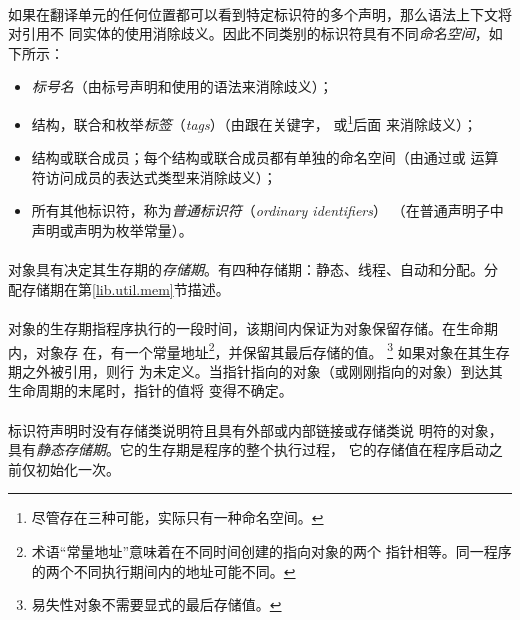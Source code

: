 {\paragraph{}
如果在翻译单元的任何位置都可以看到特定标识符的多个声明，那么语法上下文将对引用不
同实体的使用消除歧义。因此不同类别的标识符具有不同\textit{命名空间}，如下所示：
\begin{itemize}
  \item{\textit{标号名}（由标号声明和使用的语法来消除歧义）；}
  \item{结构，联合和枚举\textit{标签}（\textit{tags}）（由跟在关键字，
    或\footnote{尽管存在三种可能，实际只有一种命名空间。}后面
    来消除歧义）；}
  \item{结构或联合成员；每个结构或联合成员都有单独的命名空间（由通过或
    \tm{->}运算符访问成员的表达式类型来消除歧义）；}
  \item{所有其他标识符，称为\textit{普通标识符}（\textit{ordinary identifiers}）
    （在普通声明子中声明或声明为枚举常量）。}
\end{itemize}


\paragraph{}
对象具有决定其生存期的\textit{存储期}。有四种存储期：静态、线程、自动和分配。分
配存储期在第\ref{lib.util.mem}节描述。

\paragraph{}
对象的生存期指程序执行的一段时间，该期间内保证为对象保留存储。在生命期内，对象存
在，有一个常量地址\footnote{术语``常量地址''意味着在不同时间创建的指向对象的两个
指针相等。同一程序的两个不同执行期间内的地址可能不同。}，并保留其最后存储的值。
\footnote{易失性对象不需要显式的最后存储值。} 如果对象在其生存期之外被引用，则行
为未定义。当指针指向的对象（或刚刚指向的对象）到达其生命周期的末尾时，指针的值将
变得不确定。

\paragraph{}
标识符声明时没有存储类说明符且具有外部或内部链接或存储类说
明符的对象，具有\textit{静态存储期}。它的生存期是程序的整个执行过程，
它的存储值在程序启动之前仅初始化一次。

}
